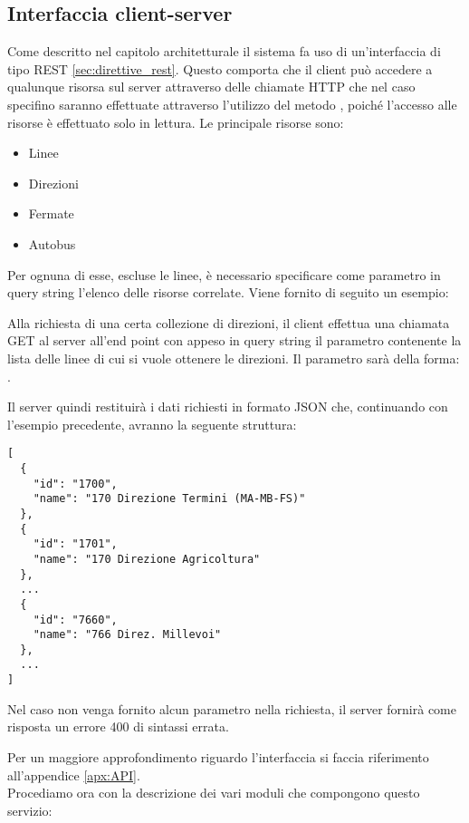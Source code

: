 \subsection{Interfaccia client-server} %
\label{sub:interfaccia_client_server}

Come descritto nel capitolo architetturale il sistema fa uso di un'interfaccia di tipo REST \ref{sec:direttive_rest}. Questo comporta che il client può accedere a qualunque risorsa sul server attraverso delle chiamate HTTP che nel caso specifino saranno effettuate attraverso l'utilizzo del metodo , poiché l'accesso alle risorse è effettuato solo in lettura.
Le principale risorse sono:
\begin{itemize}
  \item Linee
  \item Direzioni
  \item Fermate
  \item Autobus
\end{itemize}

Per ognuna di esse, escluse le linee, è necessario specificare come parametro in query string l'elenco delle risorse correlate.
Viene fornito di seguito un esempio:

Alla richiesta di una certa collezione di direzioni, il client effettua una chiamata GET al server all'end point  con appeso in query string il parametro contenente la lista delle linee di cui si vuole ottenere le direzioni.
Il parametro sarà della forma: .

Il server quindi restituirà i dati richiesti in formato JSON che, continuando con l'esempio precedente, avranno la seguente struttura:
\begin{verbatim}
[
  {
    "id": "1700",
    "name": "170 Direzione Termini (MA-MB-FS)"
  },
  {
    "id": "1701",
    "name": "170 Direzione Agricoltura"
  },
  ...
  { 
    "id": "7660",
    "name": "766 Direz. Millevoi"
  },
  ...
]
 \end{verbatim} 

Nel caso non venga fornito alcun parametro nella richiesta, il server fornirà come risposta un errore 400 di sintassi errata.

Per un maggiore approfondimento riguardo l'interfaccia si faccia riferimento all'appendice \ref{apx:API}.\\

Procediamo ora con la descrizione dei vari moduli che compongono questo servizio:

